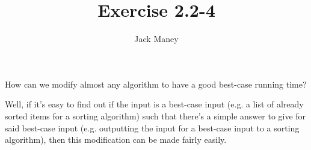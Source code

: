 \documentclass{article}
\begin{document}
\title{Exercise 2.2-4}
\author{Jack Maney}
\maketitle

How can we modify almost any algorithm to have a good best-case running time?

Well, if it's easy to find out if the input is a best-case input (e.g. a list of already sorted items for a sorting algorithm) such that there's a simple answer to give for said best-case input (e.g. outputting the input for a best-case input to a sorting algorithm), then this modification can be made fairly easily.
\end{document}
